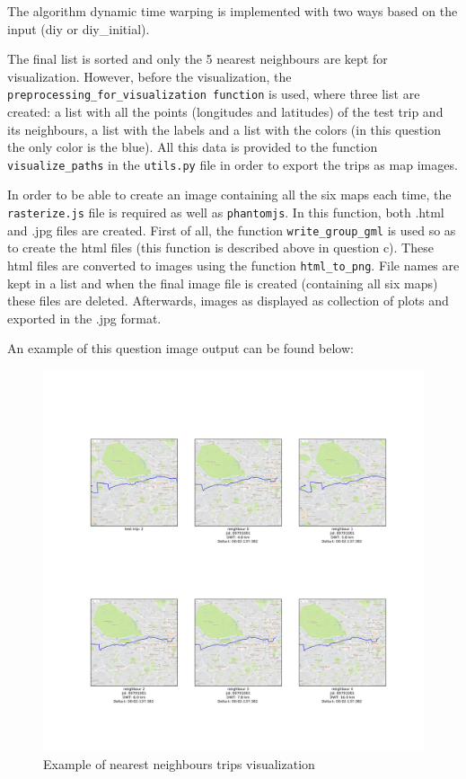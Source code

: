 \documentclass[12pt]{article}
\begin{document}
	The algorithm dynamic time warping is implemented with two ways based on the input (diy or diy\_initial). 
	
	The final list is sorted and only the 5 nearest neighbours are kept for visualization. However, before the visualization, the \texttt{preprocessing\_for\_visualization function} is used, where three list are created: a list with all the points (longitudes and latitudes) of the test trip and its neighbours, a list with the labels and a list with the colors (in this question the only color is the blue). All this data is provided to the function \texttt{visualize\_paths} in the \texttt{utils.py} file in order to export the trips as map images.
	
	In order to be able to create an image containing all the six maps each time, the \texttt{rasterize.js} file is required as well as \texttt{phantomjs}. In this function, both .html and .jpg files are created. First of all, the function \texttt{write\_group\_gml} is used so as to create the html files (this function is described above in question c). These html files are converted to images using the function \texttt{html\_to\_png}. File names are kept in a list and when the final image file is created (containing all six maps) these files are deleted. Afterwards, images as displayed as collection of plots and exported in the .jpg format.
	
	An example of this question image output can be found below:
	
	\begin{figure} [H]
		\begin{center}
			\includegraphics [scale = 0.50] {question2a1example.jpg}
			\caption{Example of nearest neighbours trips visualization}
		\end{center}
	\end{figure} 
	
\end{document}
